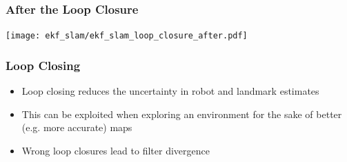 \begin{frame}
    \frametitle{After the Loop Closure}

    \begin{center}
        \texttt{[image: ekf\_slam/ekf\_slam\_loop\_closure\_after.pdf]}
    \end{center}
\end{frame}

\begin{frame}
    \frametitle{Loop Closing}

    \begin{itemize}
    \item Loop closing reduces the uncertainty in robot and landmark estimates
    \item This can be exploited when exploring an environment for the sake of better (e.g. more accurate) maps
    \item Wrong loop closures lead to filter divergence
    \end{itemize}
\end{frame}

